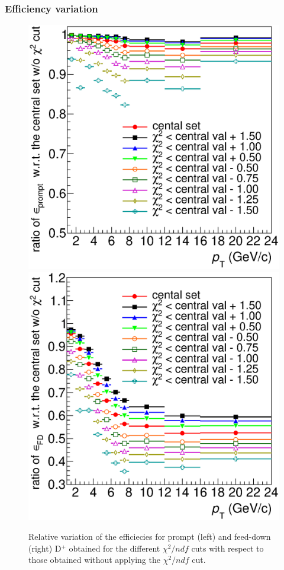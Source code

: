 \documentclass[b5paper,10pt,twoside,oldstyle,classica]{toptesi}
\begin{document}
\subsubsection{Efficiency variation}
\begin{figure}[b]
\begin{center}
{\includegraphics[scale = 0.31]{KF_CutVarSyst_ratioeffprompt_chiS.eps}}
\hspace{-0.5cm}
{\includegraphics[scale = 0.31]{KF_CutVarSyst_ratioeffFD_chiS.eps}}
\caption{Relative variation of the efficiecies for prompt (left) and feed-down (right) D$^+$ obtained for the different $\chi^2/ndf$ cuts with respect to those obtained without applying the $\chi^2/ndf$ cut.}
\label{KF_chivar_eff}
\end{center}
\end{figure} 
\end{document}

